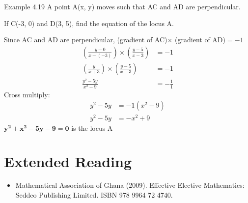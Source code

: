 \begin{example}{Example 4.19}
A point A(x, y) moves such that AC and AD are perpendicular.

If C(-3, 0) and D(3, 5), find the equation of the locus A.

\solution
Since AC and AD are perpendicular, (gradient of AC)$\times$ (gradient of AD)$= -1$
\begin{align*}
\left(\frac{y - 0}{x - (-3)}\right) \times \left(\frac{y - 5}{x - 3}\right) &= -1 \\
\left(\frac{y}{x + 3}\right) \times \left(\frac{y - 5}{x - 3}\right) &= -1 \\
\frac{y^2 - 5y}{x^2 - 9} &= -\frac{1}{1}
\end{align*}
Cross multiply:
\begin{align*}
y^2 - 5y &= -1(x^2 - 9) \\
y^2 - 5y &= -x^2 + 9
\end{align*}
$\boldsymbol{y^2 + x^2 - 5y - 9 = 0}$ is the locus A
\end{example}

\section{Extended Reading}
\begin{itemize}
  \item Mathematical Association of Ghana (2009). Effective Elective Mathematics:
  Seddco Publishing Limited. ISBN 978 9964 72 4740.
\end{itemize}
